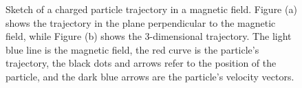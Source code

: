 \documentclass[my_thesis.tex]{subfiles}
\begin{document}
\begin{figure}
    \centering
    \caption{Sketch of a charged particle trajectory in a magnetic field. Figure (a) shows the trajectory in the plane perpendicular to the magnetic field, while Figure (b) shows the 3-dimensional trajectory. The light blue line is the magnetic field, the red curve is the particle's trajectory, the black dots and arrows refer to the position of the particle, and the dark blue arrows are the particle's velocity vectors.}
    \label{fig.gyromotion}
\end{figure}
\end{document}
